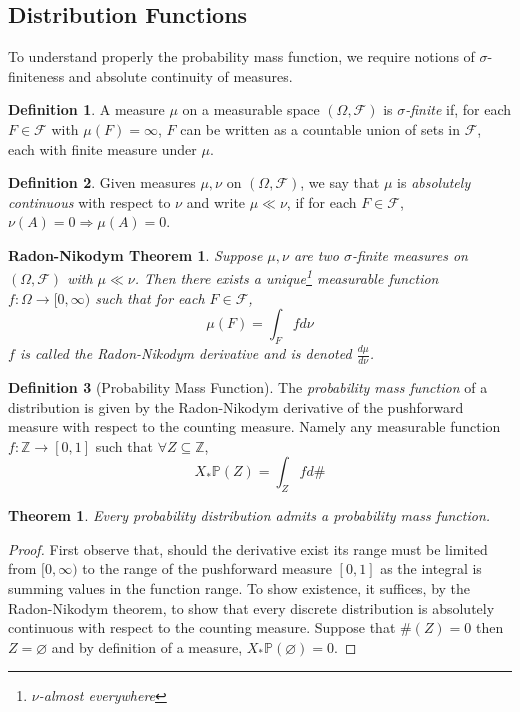 \documentclass[a4paper,11pt,oneside]{book}
\theoremstyle{plain}
\newtheorem{thm}{Theorem}[section]
\newtheorem*{rnt}{Radon-Nikodym Theorem}
\theoremstyle{definition}
\newtheorem{defn}{Definition}[section]
\begin{document}
\subsection{Distribution Functions}
To understand properly the probability mass function, we require notions of $\sigma$-finiteness and absolute continuity of measures.
\begin{defn}
A measure $\mu$ on a measurable space $(\Omega, \mathcal{F})$ is $\sigma$\emph{-finite} if, for each $F \in \mathcal{F}$ with $\mu (F)=\infty$, $F$ can be written as a countable union of sets in $\mathcal{F}$, each with finite measure under $\mu$.
\end{defn}
\begin{defn}
Given measures $\mu ,\nu$ on $(\Omega, \mathcal{F})$, we say that $\mu$ is \emph{absolutely continuous} with respect to $\nu$ and write $\mu\ll \nu$, if for each $F\in \mathcal{F}$, $\nu (A)=0 \Rightarrow \mu (A)=0$.
\end{defn}
\begin{rnt}
Suppose $\mu, \nu$ are two $\sigma$-finite measures on $(\Omega, \mathcal{F})$ with $\mu\ll \nu$. Then there exists a unique\footnote{$\nu$-almost everywhere} measurable function $f:\Omega \rightarrow [0,\infty)$ such that for each $F \in \mathcal{F}$, \[\mu (F) =\int_F f d\nu\] $f$ is called the Radon-Nikodym derivative and is denoted $\frac{d\mu}{d\nu}$.
\end{rnt}
\begin{defn}[Probability Mass Function]
The \emph{probability mass function} of a distribution is given by the Radon-Nikodym derivative of the pushforward measure with respect to the counting measure. Namely any measurable function $f:\mathbb{Z} \rightarrow [0,1]$ such that $\forall Z \subseteq \mathbb{Z}$, \[X_*\mathbb{P}(Z)=\int_Zfd\#\]
\end{defn}
\begin{thm}
Every probability distribution admits a probability mass function.
\end{thm}
\begin{proof}
First observe that, should the derivative exist its range must be limited from $[0,\infty)$ to the range of the pushforward measure $[0,1]$ as the integral is summing values in the function range. To show existence, it suffices, by the Radon-Nikodym theorem, to show that every discrete distribution is absolutely continuous with respect to the counting measure. Suppose that $\#(Z)=0$ then $Z=\varnothing$ and by definition of a measure, $X_*\mathbb{P}(\varnothing)=0$.
\end{proof}
\end{document}
